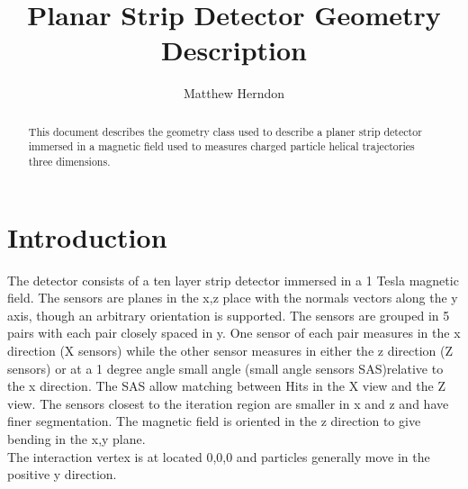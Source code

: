 \documentclass[aps,prd,superscriptaddress,floatfix]{revtex4}
\begin{document}


\title{  
\vspace{0.5cm}
Planar Strip Detector Geometry Description
}

\author {Matthew Herndon}

\address{University of Wisconsin, Madison, Wisconsin, USA}


\begin{abstract}
\vskip 0.5cm
\noindent
This document describes the geometry class used to describe a planer strip
detector immersed in a magnetic field used to measures charged particle helical trajectories three dimensions.  
\end{abstract}
\maketitle


\vspace{0.3cm}

\section{Introduction}
The detector consists of a ten layer strip detector immersed in a 1
Tesla magnetic field.  The sensors are planes in the x,z place with
the normals vectors along the y axis, though an arbitrary orientation is supported.
The sensors are grouped in 5 pairs with each pair closely spaced in y.  One sensor of each pair
measures in the x  direction (X sensors) while the other sensor measures in either the z direction (Z sensors) 
or at a 1 degree angle small angle (small angle sensors SAS)relative to the x direction.  The SAS allow matching
between Hits in the X view and the Z view.  The sensors closest to the iteration region are smaller in x and z and
have finer segmentation.  The magnetic field is oriented in the z direction to give
bending in the x,y plane. 
\\

The interaction vertex is at located 0,0,0 and particles generally move in the positive y direction.  
\\
\end{document}
